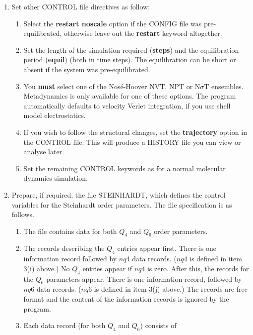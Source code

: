 \begin{enumerate}
\begin{enumerate}
  {\bf wt\_Dt} $f$ \newline where $f$ is a real number.
\item Close the metadynamics specification: \newline
  {\bf endmet}
\end{enumerate}
\item Set other CONTROL file directives as follow:
\begin{enumerate}
\item Select the {\bf restart noscale} option if the CONFIG file was
      pre-equilibrated, otherwise leave out the {\bf restart} keyword 
      altogether.
\item Set the length of the simulation required ({\bf steps}) and the 
      equilibration period ({\bf equil}) (both in time steps). The
      equilibration can be short or absent if the system was pre-equilibrated.
\item You {\bf must} select one of the Nos\'{e}-Hoover NVT, NPT or
      N$\sigma$T ensembles.  Metadynamics is only available for one of these
      options. The program automatically defaults to velocity Verlet 
      integration, if you use shell model electrostatics.
\item If you wish to follow the structural changes, set the {\bf
      trajectory} option in the CONTROL file. This will produce a HISTORY file
      you can view or analyse later.
\item Set the remaining CONTROL keywords as for a normal molecular dynamics
  simulation. 
\end{enumerate}
\item Prepare, if required, the file STEINHARDT, which defines the 
  control variables for the Steinhardt order parameters. The file 
  specification is as follows.  
\begin{enumerate}
\item The file contains data for both  $Q_{4}$ and $Q_{6}$ order 
  parameters. 
\item The records describing the $Q_{4}$ entries appear first. There is 
  one information record followed by $nq4$ data records. ($nq4$ is defined in
  item 3(i) above.) No $Q_{4}$ entries appear if $nq4$ is zero. After this, 
  the records for the  $Q_{6}$ parameters appear.  There is one information 
  record, followed by $nq6$ data records. ($nq6$ is defined in item
  3(j) above.) The records are free format and the content of
  the information records is ignored by the program.
\item Each data record (for both $Q_{4}$ and $Q_{6}$) consists of 

\end{enumerate}
\end{enumerate}
